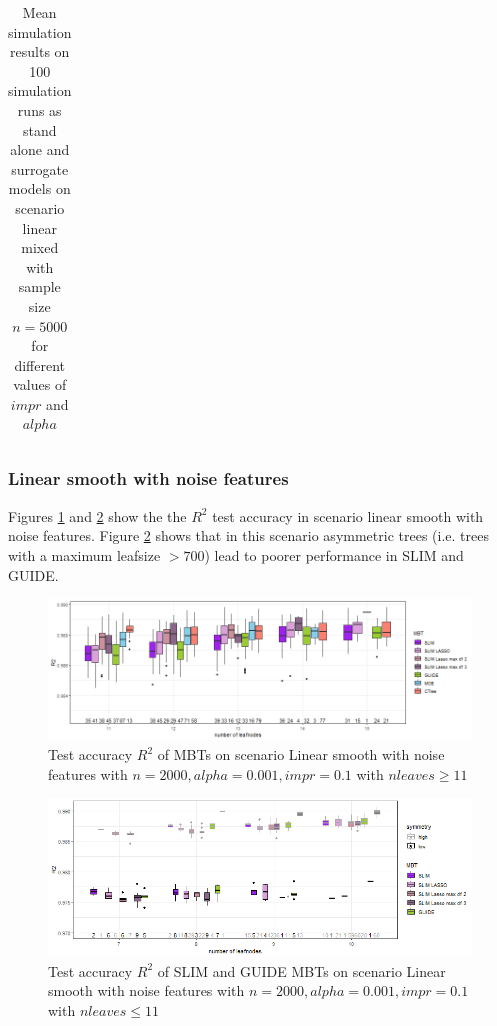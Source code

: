 \begin{table}[!htb]
\begin{tabular}[t]{l|l|r|r|r|r|r|r|r|r|r}
\end{tabular}
\caption{Mean simulation results on 100 simulation runs as stand alone and surrogate models on scenario linear mixed with sample size $n = 5000$ for different values of $impr$ and $alpha$}
\label{tab:app_linear_mixed_5000}

\end{table}


\clearpage

\subsubsection{Linear smooth with noise features}
Figures \ref{fig:app_lasso_standalone_r2_test} and \ref{fig:app_lasso_standalone_r2_test_slim} show the the $R^2$ test accuracy in scenario linear smooth with noise features. Figure \ref{fig:app_lasso_standalone_r2_test_slim} shows that in this scenario asymmetric trees (i.e. trees with a maximum leafsize $> 700$) lead to poorer performance in SLIM and GUIDE.


\begin{figure}[!htb]
     \centering
     
    \includegraphics[width=16cm]{Figures/simulations/batchtools/lasso/lasso_standalone_r2_test.png}
    \caption{Test accuracy $R^2$ of MBTs on scenario Linear smooth with noise features with $n=2000, alpha = 0.001, impr = 0.1$ with $n leaves \geq 11$}
    \label{fig:app_lasso_standalone_r2_test}
\end{figure} 

\begin{figure}[!htb]
     \centering
    \includegraphics[width=16cm]{Figures/simulations/batchtools/lasso/lasso_standalone_r2_test_slim.png}
    \caption{Test accuracy $R^2$ of SLIM and GUIDE MBTs on scenario Linear smooth with noise features with $n=2000, alpha = 0.001, impr = 0.1$ with $n leaves \leq 11$}
\label{fig:app_lasso_standalone_r2_test_slim}
\end{figure} 

